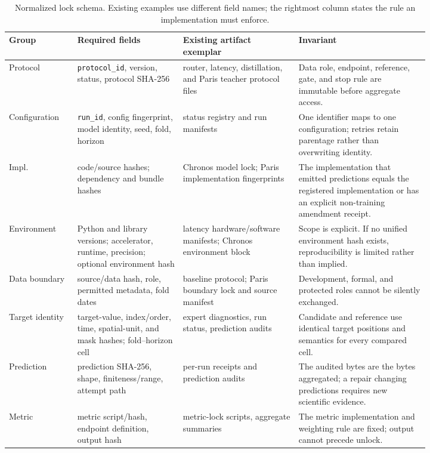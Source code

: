\begin{table}[htbp]
\centering
\caption{Normalized lock schema.  Existing examples use different field names; the rightmost column states the rule an implementation must enforce.}
\label{tab:lock-schema}
\scriptsize
\begin{tabular}{>{\raggedright\arraybackslash}p{0.12\linewidth}>{\raggedright\arraybackslash}p{0.21\linewidth}>{\raggedright\arraybackslash}p{0.23\linewidth}>{\raggedright\arraybackslash}p{0.26\linewidth}}
\toprule
Group & Required fields & Existing artifact exemplar & Invariant \\
\midrule
Protocol & \texttt{protocol\_id}, version, status, protocol SHA-256 & router, latency, distillation, and Paris teacher protocol files & Data role, endpoint, reference, gate, and stop rule are immutable before aggregate access. \\
Configuration & \texttt{run\_id}, config fingerprint, model identity, seed, fold, horizon & status registry and run manifests & One identifier maps to one configuration; retries retain parentage rather than overwriting identity. \\
Impl. & code/source hashes; dependency and bundle hashes & Chronos model lock; Paris implementation fingerprints & The implementation that emitted predictions equals the registered implementation or has an explicit non-training amendment receipt. \\
Environment & Python and library versions; accelerator, runtime, precision; optional environment hash & latency hardware/software manifests; Chronos environment block & Scope is explicit.  If no unified environment hash exists, reproducibility is limited rather than implied. \\
Data boundary & source/data hash, role, permitted metadata, fold dates & baseline protocol; Paris boundary lock and source manifest & Development, formal, and protected roles cannot be silently exchanged. \\
Target identity & target-value, index/order, time, spatial-unit, and mask hashes; fold--horizon cell & expert diagnostics, run status, prediction audits & Candidate and reference use identical target positions and semantics for every compared cell. \\
Prediction & prediction SHA-256, shape, finiteness/range, attempt path & per-run receipts and prediction audits & The audited bytes are the bytes aggregated; a repair changing predictions requires new scientific evidence. \\
Metric & metric script/hash, endpoint definition, output hash & metric-lock scripts, aggregate summaries & The metric implementation and weighting rule are fixed; output cannot precede unlock. \\

\end{tabular}
\end{table}
